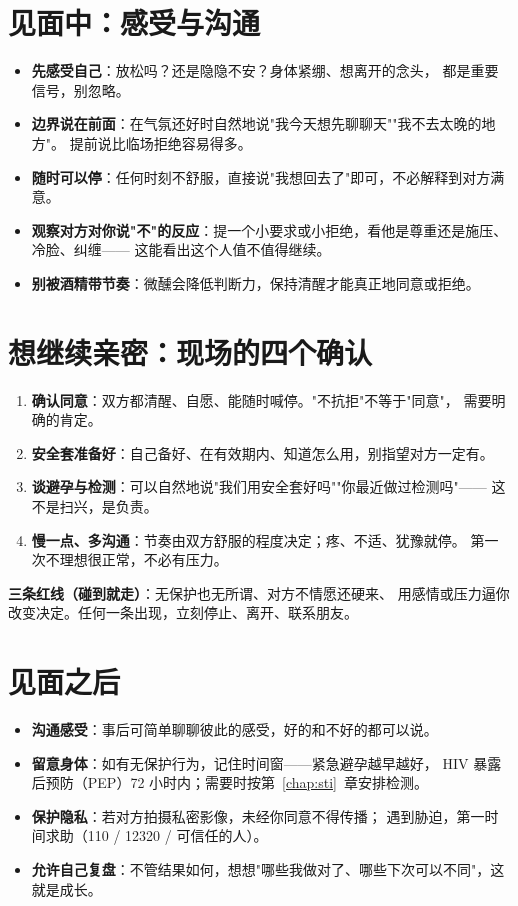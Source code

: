\documentclass[12pt,UTF8,openany]{ctexbook}
\begin{document}
\section{见面中：感受与沟通}

\begin{itemize}[leftmargin=2em]
  \item \textbf{先感受自己}：放松吗？还是隐隐不安？身体紧绷、想离开的念头，
        都是重要信号，别忽略。
  \item \textbf{边界说在前面}：在气氛还好时自然地说"我今天想先聊聊天""我不去太晚的地方"。
        提前说比临场拒绝容易得多。
  \item \textbf{随时可以停}：任何时刻不舒服，直接说"我想回去了"即可，不必解释到对方满意。
  \item \textbf{观察对方对你说"不"的反应}：提一个小要求或小拒绝，看他是尊重还是施压、冷脸、纠缠——
        这能看出这个人值不值得继续。
  \item \textbf{别被酒精带节奏}：微醺会降低判断力，保持清醒才能真正地同意或拒绝。
\end{itemize}

\section{想继续亲密：现场的四个确认}

\begin{enumerate}[leftmargin=2em,itemsep=0.3em]
  \item \textbf{确认同意}：双方都清醒、自愿、能随时喊停。"不抗拒"不等于"同意"，
        需要明确的肯定。
  \item \textbf{安全套准备好}：自己备好、在有效期内、知道怎么用，别指望对方一定有。
  \item \textbf{谈避孕与检测}：可以自然地说"我们用安全套好吗""你最近做过检测吗"——
        这不是扫兴，是负责。
  \item \textbf{慢一点、多沟通}：节奏由双方舒服的程度决定；疼、不适、犹豫就停。
        第一次不理想很正常，不必有压力。
\end{enumerate}

\noindent\textbf{三条红线（碰到就走）}：无保护也无所谓、对方不情愿还硬来、
用感情或压力逼你改变决定。任何一条出现，立刻停止、离开、联系朋友。

\section{见面之后}

\begin{itemize}[leftmargin=2em]
  \item \textbf{沟通感受}：事后可简单聊聊彼此的感受，好的和不好的都可以说。
  \item \textbf{留意身体}：如有无保护行为，记住时间窗——紧急避孕越早越好，
        HIV 暴露后预防（PEP）72 小时内；需要时按第~\ref{chap:sti}~章安排检测。
  \item \textbf{保护隐私}：若对方拍摄私密影像，未经你同意不得传播；
        遇到胁迫，第一时间求助（110 / 12320 / 可信任的人）。
  \item \textbf{允许自己复盘}：不管结果如何，想想"哪些我做对了、哪些下次可以不同"，这就是成长。
\end{itemize}
\end{document}
